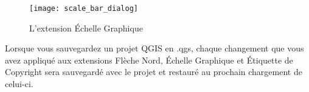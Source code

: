 \begin{figure}[ht]
   \begin{center}
   \texttt{[image: scale\_bar\_dialog]}
   \caption{L'extension Échelle Graphique \nixcaption}\label{fig:scale_bar}
\end{center}  
\end{figure}

\begin{Tip}\caption{\textsc{Sauvegarde des paramètres de l'extension avec le projet}}
Lorsque vous sauvegardez un projet QGIS en .qgs, chaque changement que 
vous avez appliqué aux extensions Flèche Nord, Échelle Graphique et Étiquette 
de Copyright sera sauvegardé avec le projet et restauré au prochain chargement 
de celui-ci.
\end{Tip}